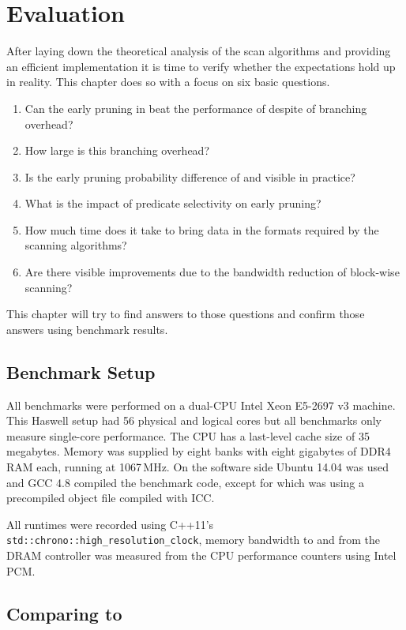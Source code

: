 \chapter{Evaluation}
\label{chapter:evaluation}

After laying down the theoretical analysis of the scan algorithms and providing
an efficient implementation it is time to verify whether the expectations hold
up in reality. This chapter does so with a focus on six basic questions.

\begin{enumerate}
  \item Can the early pruning in \bwv{} beat the performance of \simdscan{}
despite of branching overhead?
  \item How large is this branching overhead?
  \item Is the early pruning probability difference of \bwv{} and \bs{} visible in practice?
  \item What is the impact of predicate selectivity on early pruning?
  \item How much time does it take to bring data in the formats required by the scanning algorithms?
  \item Are there visible improvements due to the bandwidth reduction of block-wise scanning?
\end{enumerate}

This chapter will try to find answers to those questions and confirm those
answers using benchmark results.

\section{Benchmark Setup}

All benchmarks were performed on a dual-CPU Intel Xeon E5-2697 v3 machine. This
Haswell setup had 56 physical and logical cores but all benchmarks only measure
single-core performance. The CPU has a last-level cache size of 35 megabytes.
Memory was supplied by eight banks with eight gigabytes of DDR4 RAM each,
running at 1067\,MHz. On the software side Ubuntu 14.04 was used and GCC 4.8
compiled the benchmark code, except for \simdscan{} which was using a
precompiled object file compiled with ICC.

All runtimes were recorded using C++11's
\texttt{std::chrono::high\_resolution\_clock}, memory bandwidth to and from the
DRAM controller was measured from the CPU performance counters using Intel PCM.

\section{Comparing \simdscan{} to \bwv{}}

